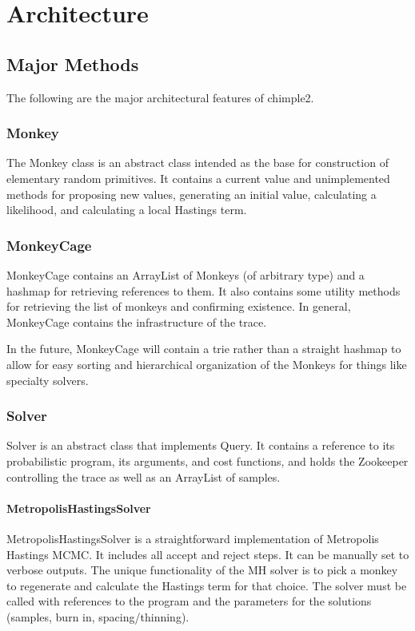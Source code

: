 \chapter{Architecture}

\noindent

\section{Major Methods}
The following are the major architectural features of chimple2.

\subsection{Monkey}
The Monkey class is an abstract class intended as the base for construction of elementary random primitives. It contains a current value and unimplemented methods for proposing new values, generating an initial value, calculating a likelihood, and calculating a local Hastings term. 

\subsection{MonkeyCage}
MonkeyCage contains an ArrayList of Monkeys (of arbitrary type) and a hashmap for retrieving references to them. It also contains some utility methods for retrieving the list of monkeys and confirming existence. In general, MonkeyCage contains the infrastructure of the trace. 

In the future, MonkeyCage will contain a trie rather than a straight hashmap to allow for easy sorting and hierarchical organization of the Monkeys for things like specialty solvers.

\subsection{Solver}
Solver is an abstract class that implements Query. It contains a reference to its probabilistic program, its arguments, and cost functions, and holds the Zookeeper controlling the trace as well as an ArrayList of samples. 

\subsubsection{MetropolisHastingsSolver}

MetropolisHastingsSolver is a straightforward implementation of Metropolis Hastings MCMC. It includes all accept and reject steps. It can be manually set to verbose outputs. The unique functionality of the MH solver is to pick a monkey to regenerate and calculate the Hastings term for that choice. The solver must be called with references to the program and the parameters for the solutions (samples, burn in, spacing/thinning).

